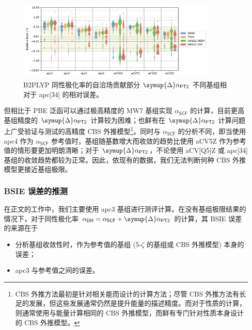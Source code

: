 \begin{figure}[!t]
    \centering
    \includegraphics[width=0.9\textwidth]{assets/converg-b2p-pt2-apc4.pdf}
    \caption[B2PLYP $\symup{\Delta} \alpha_\textsf{PT2}$ 不同基组相对于 apc\text{[34]} 的相对误差]{B2PLYP 同性极化率的自洽场贡献部分 $\symup{\Delta} \alpha_\textsf{PT2}$ 不同基组相对于 apc[34] 的相对误差。}
    \label{fig.6.converg-b2p-pt2-apc4}
\end{figure}

但相比于 PBE 泛函可以通过极高精度的 MW7 基组实现 $\alpha_\textsf{SCF}$ 的计算，目前更高基组精度的 $\symup{\Delta} \alpha_\textsf{PT2}$ 计算较为困难；也鲜有在 $\symup{\Delta} \alpha_\textsf{PT2}$ 计算问题上广受验证与测试的高精度 CBS 外推模型\footnote{CBS 外推方法最初是针对相关能而设计的计算方法\cite{Nyden-Petersson.JCP.1981}；尽管 CBS 外推方法有长足的发展\cite{Peterson-Dunning.JCP.1994, Nyden-Petersson.JCP.1981, Petersson-Mantzaris.JCP.1988, Jensen-Jensen.TCA.2005, Karton-Martin.TCA.2006, Klopper-Kutzelnigg.JMST.1986, Kutzelnigg-Morgan.JCP.1992, Martin-Martin.CPL.1996, Helgaker-Noga.JCP.1997, Halkier-Wilson.CPL.1998, Halkier-Olsen.CPL.1999}，但这些发展通常仍然是提升能量的描述精度。而对于性质的计算，则通常使用与能量计算相同的 CBS 外推模型\cite{Monten-Deleuze.MP.2011, Huzak-Deleuze.JCP.2013, Hait-Head-Gordon.JCTC.2018, Hait-Head-Gordon.PCCP.2018}，而鲜有专门针对性质本身设计的 CBS 外推模型。}。同时与 $\alpha_\textsf{SCF}$ 的分析不同，即当使用 apc4 作为 $\alpha_\textsf{SCF}$ 参考值时，基组随基数增大而收敛的趋势比使用 aCV5Z 作为参考值的情形要更加明朗清晰；对于 $\symup{\Delta} \alpha_\textsf{PT2}$，不论使用 aCV[Q5]Z 或 apc[34] 基组的收敛趋势都较为正常。因此，依现有的数据，我们无法判断何种 CBS 外推模型更接近基组极限。

\subsubsection{BSIE 误差的推测}

在正文的工作中，我们主要使用 apc3 基组进行测评计算。在没有基组极限结果的情况下，对于同性极化率 $\alpha_\textsf{DH} = \alpha_\textsf{SCF} + \symup{\Delta} \alpha_\textsf{PT2}$ 的计算，其 BSIE 误差的来源在于
\begin{itemize}[nosep]
    \item 分析基组收敛性时，作为参考值的基组 (5-$\zeta$ 的基组或 CBS 外推模型) 本身的误差；
    \item apc3 与参考值之间的误差。
\end{itemize}

